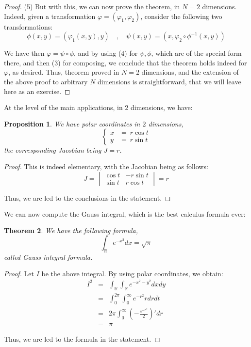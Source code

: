 \documentclass[12pt]{amsbook}
\newtheorem{theorem}{Theorem}[chapter]
\newtheorem{proposition}[theorem]{Proposition}
\begin{document}
\begin{proof}
(5) But with this, we can now prove the theorem, in $N=2$ dimensions. Indeed, given a transformation $\varphi=(\varphi_1,\varphi_2)$, consider the following two transformations:
$$\phi(x,y)=(\varphi_1(x,y),y)\quad,\quad \psi(x,y)=(x,\varphi_2\circ\phi^{-1}(x,y))$$

We have then $\varphi=\psi\circ\phi$, and by using (4) for $\psi,\phi$, which are of the special form there, and then (3) for composing, we conclude that the theorem holds indeed for $\varphi$, as desired. Thus, theorem proved in $N=2$ dimensions, and the extension of the above proof to arbitrary $N$ dimensions is straightforward, that we will leave here as an exercise.
\end{proof}

At the level of the main applications, in 2 dimensions, we have:


\begin{proposition}
We have polar coordinates in $2$ dimensions,
$$\begin{cases}
x\!\!\!&=\ r\cos t\\
y\!\!\!&=\ r\sin t
\end{cases}$$
the corresponding Jacobian being $J=r$.
\end{proposition}

\begin{proof}
This is indeed elementary, with the Jacobian being as follows:
$$J
=\begin{vmatrix}
\cos t&-r\sin t\\
\sin t&r\cos t
\end{vmatrix}=r$$

Thus, we are led to the conclusions in the statement.
\end{proof}

We can now compute the Gauss integral, which is the best calculus formula ever:


\begin{theorem}
We have the following formula,
$$\int_\mathbb Re^{-x^2}dx=\sqrt{\pi}$$
called Gauss integral formula.
\end{theorem}

\begin{proof}
Let $I$ be the above integral. By using polar coordinates, we obtain:
\begin{eqnarray*}
I^2
&=&\int_\mathbb R\int_\mathbb Re^{-x^2-y^2}dxdy\\
&=&\int_0^{2\pi}\int_0^\infty e^{-r^2}rdrdt\\
&=&2\pi\int_0^\infty\left(-\frac{e^{-r^2}}{2}\right)'dr\\
&=&\pi
\end{eqnarray*}

Thus, we are led to the formula in the statement.
\end{proof}
\end{document}
